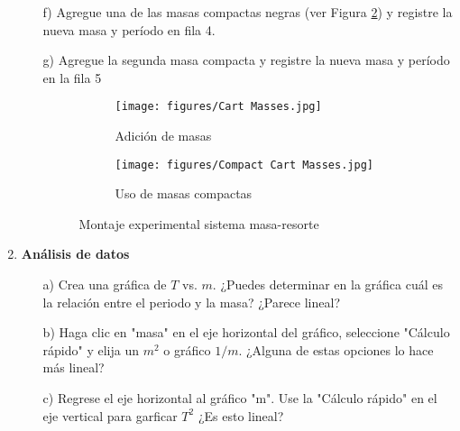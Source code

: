 \documentclass[9pt,a4paper,twocolumn,twoside]{tau-class/tau}
\begin{document}
\begin{enumerate}
\begin{itemize}
                \item [f)]  Agregue  una  de  las  masas  compactas  negras  (ver  Figura  \textcolor{blue}{\ref{fig:4b}})  y  registre  la  nueva  masa  y  período  en  fila  4.
                \item [g)]   Agregue  la  segunda  masa  compacta  y  registre  la  nueva  masa  y  período  en  la  fila  5
                 \begin{figure}[htbp]
                     \centering
                     \hfill
                     \begin{subfigure}[b]{0.42\linewidth}
                         \centering
                         \texttt{[image: figures/Cart Masses.jpg]}
                         \caption{ Adición  de  masas}
                         \label{fig:4a}
                     \end{subfigure}
                     \begin{subfigure}[b]{0.42\linewidth}
                         \centering
                         \texttt{[image: figures/Compact Cart Masses.jpg]}
                         \caption{ Uso  de  masas   compactas}
                         \label{fig:4b}
                     \end{subfigure}
                    \caption{Montaje experimental sistema masa-resorte}
                    \label{fig:montaje_experimental_2}
                \end{figure}
            \end{itemize}
        \item \textbf{Análisis de datos}
            \begin{itemize}
                \item [a)]  Crea  una  gráfica  de  $T$  vs.  $m$.  ¿Puedes  determinar  en  la  gráfica  cuál  es  la  relación  entre  el  periodo  y la masa?  ¿Parece  lineal?
                \item [b)] Haga  clic  en  "masa"  en  el  eje  horizontal  del  gráfico,  seleccione  "Cálculo  rápido"  y  elija  un  $m^2$ o  gráfico  $1/m$.  ¿Alguna  de  estas  opciones  lo  hace  más  lineal?
                \item [c)] Regrese  el  eje  horizontal  al  gráfico  "m".  Use  la  "Cálculo  rápido"  en  el  eje  vertical  para garficar $T^2$  ¿Es  esto  lineal?
            \end{itemize}
    \end{enumerate}
\end{document}
